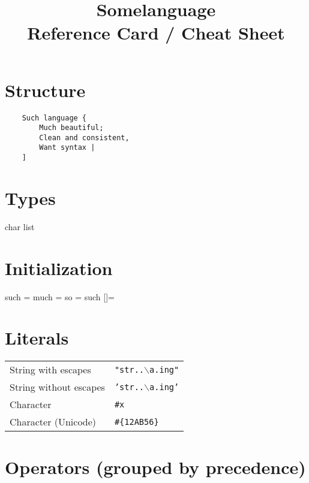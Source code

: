 \documentclass{refcard}
\title{Somelanguage\\Reference Card / Cheat Sheet}
\begin{document}
\maketitle

\section{Structure}

\begin{verbatim}
	Such language {
	    Much beautiful;
	    Clean and consistent,
	    Want syntax |
	]
\end{verbatim}

\section{Types}

\begin{ldesc}
	   {char   }
	   {list   }
\end{ldesc}

\section{Initialization}

\begin{ldesc}
	    such  =
	   much  =
	 so    =
	             such  []=
\end{ldesc}

\section{Literals}

\begin{tabular}{ll}
	String with escapes    & \texttt{"str..$\backslash{}$a.ing"} \\
	String without escapes & \texttt{'str..$\backslash{}$a.ing'} \\
	Character              & \texttt{\#x} \\
	Character (Unicode)    & \texttt{\#\{12AB56\}} \\
\end{tabular}

\section{Operators (grouped by precedence)}
\end{document}
